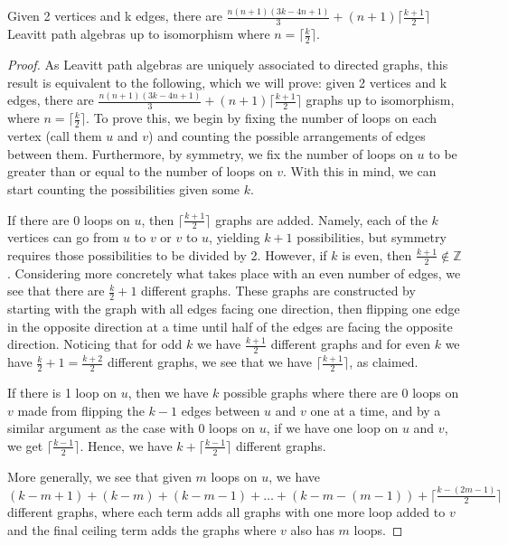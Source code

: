 \documentclass[10pt,a4paper]{amsart}
\begin{document}
\begin{thm}
    Given 2 vertices and k edges, there are $\frac{n(n+1)(3k-4n+1)}{3}+(n+1)\lceil\frac{k+1}{2}\rceil$ Leavitt path algebras up to isomorphism where $n=\lceil\frac{k}{2}\rceil$.
\end{thm}

\begin{proof}
     As Leavitt path algebras are uniquely associated to directed graphs, this result is equivalent to the following, which we will prove: given 2 vertices and k edges, there are $\frac{n(n+1)(3k-4n+1)}{3}+(n+1)\lceil\frac{k+1}{2}\rceil$ graphs up to isomorphism, where $n=\lceil\frac{k}{2}\rceil$. To prove this, we begin by fixing the number of loops on each vertex (call them $u$ and $v$) and counting the possible arrangements of edges between them. Furthermore, by symmetry, we fix the number of loops on $u$ to be greater than or equal to the number of loops on $v$. With this in mind, we can start counting the possibilities given some $k$. 
     
    If there are 0 loops on $u$, then $\lceil\frac{k+1}{2}\rceil$ graphs are added. Namely, each of the $k$ vertices can go from $u$ to $v$ or $v$ to $u$, yielding $k+1$ possibilities, but symmetry requires those possibilities to be divided by 2. However, if $k$ is even, then $\frac{k+1}{2}\notin\mathbb{Z}$. Considering more concretely what takes place with an even number of edges, we see that there are $\frac{k}{2} + 1$ different graphs. These graphs are constructed by starting with the graph with all edges facing one direction, then flipping one edge in the opposite direction at a time until half of the edges are facing the opposite direction. Noticing that for odd $k$ we have $\frac{k+1}{2}$ different graphs and for even $k$ we have $\frac{k}{2} + 1 = \frac{k+2}{2}$ different graphs, we see that we have $\lceil\frac{k+1}{2}\rceil$, as claimed. 
    
    If there is 1 loop on $u$, then we have $k$ possible graphs where there are 0 loops on $v$ made from flipping the $k-1$ edges between $u$ and $v$ one at a time, and by a similar argument as the case with 0 loops on $u$, if we have one loop on $u$ and $v$, we get $\lceil\frac{k-1}{2}\rceil$. Hence, we have $k+\lceil\frac{k-1}{2}\rceil$ different graphs.
    
    More generally, we see that given $m$ loops on $u$, we have $(k-m+1) + (k-m) + (k-m-1) +\dots + (k-m-(m-1)) + \lceil\frac{k-(2m-1)}{2}\rceil$ different graphs, where each term adds all graphs with one more loop added to $v$ and the final ceiling term adds the graphs where $v$ also has $m$ loops.


\end{proof}
\end{document}

